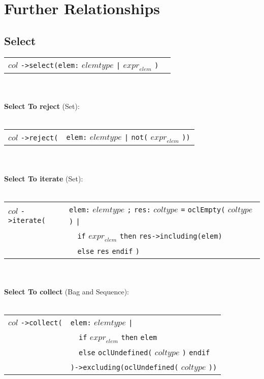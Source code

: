 \appendix
\section{Further Relationships}
\subsection{Select}

\begin{tabular}{ll}
$\mathit{col}$ \verb+->select(+\verb+elem+\verb+:+
$\mathit{elemtype}$ \verb+|+ $\mathit{expr}_{\mathit{elem}}$
\verb+)+&
\end{tabular}\\\\
{\bf Select To reject} (Set):\\\\
\begin{tabular}{ll}
$\mathit{col}$ \verb+->reject(+& \verb+elem+\verb+:+
$\mathit{elemtype}$ \verb+|+ \verb+not(+
$\mathit{expr}_{\mathit{elem}}$ \verb+))+
\end{tabular}\\\\
{\bf Select To iterate} (Set):\\\\
\begin{tabular}{ll}
$\mathit{col}$ \verb+->iterate(+& \verb+elem+\verb+:+
$\mathit{elemtype}$ \verb+;+ \verb+res+\verb+:+ $\mathit{coltype}$
\verb+=+
\verb+oclEmpty(+ $\mathit{coltype}$ \verb+)+ \verb+|+\\
&\verb+  +\verb+if+ $\mathit{expr}_{\mathit{elem}}$ \verb+then+
\verb+res+\verb+->including(+\verb+elem+\verb+)+ \\
&\verb+  +\verb+else+ \verb+res+ \verb+endif+ \verb+)+
\end{tabular}\\\\
{\bf Select To collect} (Bag and Sequence):\\\\
\begin{tabular}{ll}
$\mathit{col}$ \verb+->collect(+&
\verb+elem+\verb+:+ $\mathit{elemtype}$ \verb+|+\\
&\verb+  +\verb+if+ $\mathit{expr}_{\mathit{elem}}$ \verb+then+ \verb+elem+\\
&\verb+  +\verb+else+ \verb+oclUndefined(+ $\mathit{coltype}$ \verb+)+ \verb+endif+\\
&\hspace{-2.63mm}\verb+)->excluding(oclUndefined(+
$\mathit{coltype}$ \verb+))+
\end{tabular}\\\\
